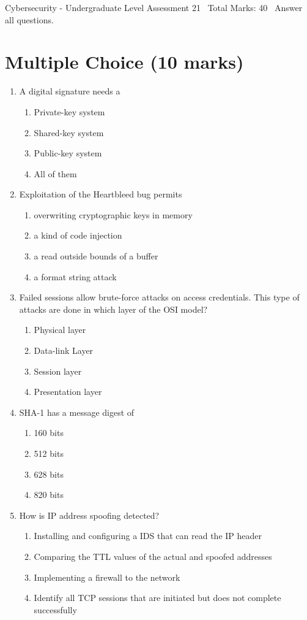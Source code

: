 \documentclass[12pt]{article}
\begin{document}
\begin{center}
Cybersecurity - Undergraduate Level Assessment 21 \
Total Marks: 40 \
Answer all questions.
\end{center}

\section*{Multiple Choice (10 marks)}
\begin{enumerate}[label=\arabic*.]
\item A digital signature needs a
\begin{enumerate}[label=(\alph*)]
    \item Private-key system
    \item Shared-key system
    \item Public-key system
    \item All of them
\end{enumerate}
\item Exploitation of the Heartbleed bug permits
\begin{enumerate}[label=(\alph*)]
    \item overwriting cryptographic keys in memory
    \item a kind of code injection
    \item a read outside bounds of a buffer
    \item a format string attack
\end{enumerate}
\item Failed sessions allow brute-force attacks on access credentials. This type of attacks are done in which layer of the OSI model?
\begin{enumerate}[label=(\alph*)]
    \item Physical layer
    \item Data-link Layer
    \item Session layer
    \item Presentation layer
\end{enumerate}
\item SHA-1 has a message digest of
\begin{enumerate}[label=(\alph*)]
    \item 160 bits
    \item 512 bits
    \item 628 bits
    \item 820 bits
\end{enumerate}
\item How is IP address spoofing detected?
\begin{enumerate}[label=(\alph*)]
    \item Installing and configuring a IDS that can read the IP header
    \item Comparing the TTL values of the actual and spoofed addresses
    \item Implementing a firewall to the network
    \item Identify all TCP sessions that are initiated but does not complete successfully
\end{enumerate}
\end{enumerate}
\end{document}
